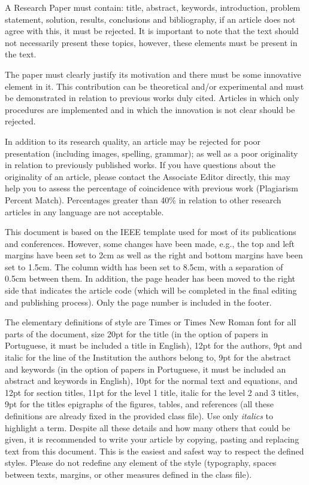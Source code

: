 A Research Paper must contain: title, abstract, keywords, introduction, problem statement, solution, results, conclusions and bibliography, if an article does not agree with this, it must be rejected. It is important to note that the text should not necessarily present these topics, however, these elements must be present in the text.

The paper must clearly justify its motivation and there must be some innovative element in it. This contribution can be theoretical and/or experimental and must be demonstrated in relation to previous works duly cited. Articles in which only procedures are implemented and in which the innovation is not clear should be rejected.

In addition to its research quality, an article may be rejected for poor presentation (including images, spelling, grammar); as well as a poor originality in relation to previously published works. If you have questions about the originality of an article, please contact the Associate Editor directly, this may help you to assess the percentage of coincidence with previous work (Plagiarism Percent Match). Percentages greater than 40\% in relation to other research articles in any language are not acceptable.

This document is based on the IEEE template used for most of its publications and conferences. However, some changes have been made, e.g., the top and left margins have been set to 2cm as well as the right and bottom margins have been set to 1.5cm. The column width has been set to 8.5cm, with a separation of 0.5cm between them. In addition, the page header has been moved to the right side that indicates the article code (which will be completed in the final editing and publishing process). Only the page number is included in the footer.

The elementary definitions of style are Times or Times New Roman font for all parts of the document, size 20pt for the title (in the option of papers in Portuguese, it must be included a title in English), 12pt for the authors, 9pt and italic for the line of the Institution the authors belong to, 9pt for the abstract and keywords (in the option of papers in Portuguese, it must be included an abstract and keywords in English), 10pt for the normal text and equations, and 12pt for section titles, 11pt for the level 1 title, italic for the level 2 and 3 titles, 9pt for the titles epigraphs of the figures, tables, and references (all these definitions are already fixed in the provided class file). Use only \emph{italics} to highlight a term. Despite all these details and how many others that could be given, it is recommended to write your article by copying, pasting and replacing text from this document. This is the easiest and safest way to respect the defined styles. Please do not redefine any element of the style (typography, spaces between texts, margins, or other measures defined in the class file).

